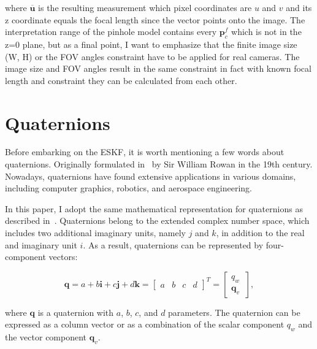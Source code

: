 where $\overline{\mathbf{u}}$ is the resulting measurement which pixel coordinates are $u$ and $v$ and its z coordinate equals the focal length since the vector points onto the image. The interpretation range of the pinhole model contains every $\mathbf{p}_c^f$ which is not in the z=0 plane, but as a final point, I want to emphasize that the finite image size (W, H) or the FOV angles constraint have to be applied for real cameras. The image size and FOV angles result in the same constraint in fact with known focal length and constraint they can be calculated from each other.

\section{Quaternions}

Before embarking on the ESKF, it is worth mentioning a few words about quaternions. Originally formulated in~\cite{quaternions} by Sir William Rowan in the 19th century. Nowadays, quaternions have found extensive applications in various domains, including computer graphics, robotics, and aerospace engineering.

In this paper, I adopt the same mathematical representation for quaternions as described in~\cite{quaternion-eskf}. Quaternions belong to the extended complex number space, which includes two additional imaginary units, namely $j$ and $k$, in addition to the real and imaginary unit $i$. As a result, quaternions can be represented by four-component vectors:

\begin{equation}
    \mathbf{q} = a + b\mathbf{i} + c\mathbf{j} + d\mathbf{k} = \begin{bmatrix}
    a & b & c & d
    \end{bmatrix}^T = \begin{bmatrix}
    q_w \ \\ \mathbf{q}_v
    \end{bmatrix},
\end{equation}

where $\mathbf{q}$ is a quaternion with $a$, $b$, $c$, and $d$ parameters. The quaternion can be expressed as a column vector or as a combination of the scalar component $q_w$ and the vector component $\mathbf{q}_{v}$. 

